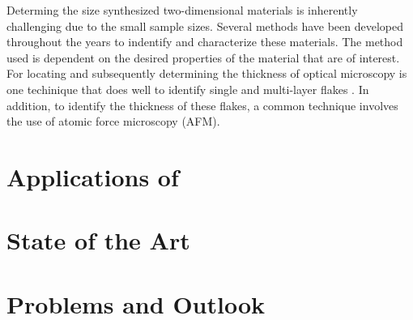 \documentclass[%
 reprint,
 amsmath,amssymb,
 aps,
pra,
floatfix,
]{revtex4-1}
\begin{document}
Determing the size synthesized two-dimensional materials is inherently challenging due to the small sample sizes. Several methods have been developed throughout the years to indentify and characterize these materials. The method used is dependent on the desired properties of the material that are of interest. For locating and subsequently determining the thickness of  optical microscopy is one techinique that does well to identify single and multi-layer flakes \cite{acsnanoReview2013}. In addition, to identify the thickness of these flakes, a common technique involves the use of atomic force microscopy (AFM).

\section{\label{sec:mos2_applications} Applications of }

\section{\label{sec:state_of_the_art} State of the Art}

\section{\label{sec:problems_and_outlook} Problems and Outlook}




\end{document}
